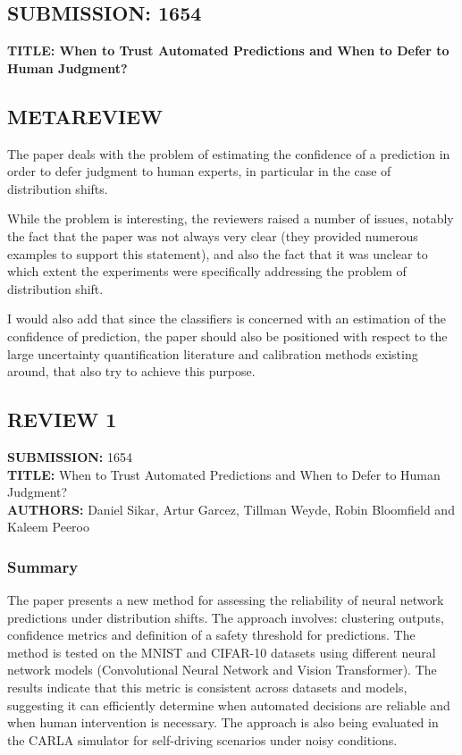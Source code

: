 \subsection*{SUBMISSION: 1654}
\textbf{TITLE: When to Trust Automated Predictions and When to Defer to Human Judgment?}

\subsection*{METAREVIEW}
The paper deals with the problem of estimating the confidence of a prediction in order to defer judgment to human experts, in particular in the case of distribution shifts.

While the problem is interesting, the reviewers raised a number of issues, notably the fact that the paper was not always very clear (they provided numerous examples to support this statement), and also the fact that it was unclear to which extent the experiments were specifically addressing the problem of distribution shift.

I would also add that since the classifiers is concerned with an estimation of the confidence of prediction, the paper should also be positioned with respect to the large uncertainty quantification literature and calibration methods existing around, that also try to achieve this purpose.

\subsection*{REVIEW 1}
\textbf{SUBMISSION:} 1654\\
\textbf{TITLE:} When to Trust Automated Predictions and When to Defer to Human Judgment?\\
\textbf{AUTHORS:} Daniel Sikar, Artur Garcez, Tillman Weyde, Robin Bloomfield and Kaleem Peeroo

\subsubsection*{Summary}
The paper presents a new method for assessing the reliability of neural network predictions under distribution shifts. The approach involves: clustering outputs, confidence metrics and definition of a safety threshold for predictions. The method is tested on the MNIST and CIFAR-10 datasets using different neural network models (Convolutional Neural Network and Vision Transformer). The results indicate that this metric is consistent across datasets and models, suggesting it can efficiently determine when automated decisions are reliable and when human intervention is necessary. The approach is also being evaluated in the CARLA simulator for self-driving scenarios under noisy conditions.


